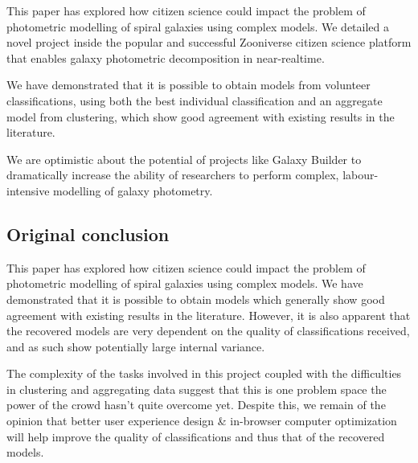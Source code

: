 \documentclass[../main.tex]{subfiles}
\begin{document}
\label{sec:conclusions}
This paper has explored how citizen science could impact the problem of photometric modelling of spiral galaxies using complex models. We detailed a novel project inside the popular and successful Zooniverse citizen science platform that enables galaxy photometric decomposition in near-realtime.

We have demonstrated that it is possible to obtain models from volunteer classifications, using both the best individual classification and an aggregate model from clustering, which show good agreement with existing results in the literature.

We are optimistic about the potential of projects like Galaxy Builder to dramatically increase the ability of researchers to perform complex, labour-intensive modelling of galaxy photometry.

\subsection{Original conclusion}
This paper has explored how citizen science could impact the problem of photometric modelling of spiral galaxies using complex models. We have demonstrated that it is possible to obtain models which generally show good agreement with existing results in the literature. However, it is also apparent that the recovered models are very dependent on the quality of classifications received, and as such show potentially large internal variance.

The complexity of the tasks involved in this project coupled with the difficulties in clustering and aggregating data suggest that this is one problem space the power of the crowd hasn't quite overcome yet. Despite this, we remain of the opinion that better user experience design \& in-browser computer optimization will help improve the quality of classifications and thus that of the recovered models.
\end{document}
